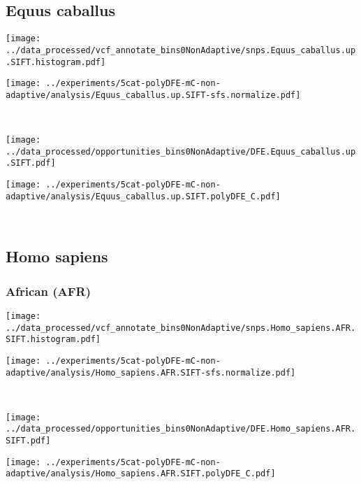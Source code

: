\subsection{Equus caballus}

\begin{minipage}{0.49\linewidth}
    \texttt{[image: ../data\_processed/vcf\_annotate\_bins0NonAdaptive/snps.Equus\_caballus.up.SIFT.histogram.pdf]}
\end{minipage}
\begin{minipage}{0.49\linewidth}
    \texttt{[image: ../experiments/5cat-polyDFE-mC-non-adaptive/analysis/Equus\_caballus.up.SIFT-sfs.normalize.pdf]}
\end{minipage}
\\
\begin{minipage}{0.49\linewidth}
    \texttt{[image: ../data\_processed/opportunities\_bins0NonAdaptive/DFE.Equus\_caballus.up.SIFT.pdf]}
\end{minipage}
\begin{minipage}{0.49\linewidth}
    \texttt{[image: ../experiments/5cat-polyDFE-mC-non-adaptive/analysis/Equus\_caballus.up.SIFT.polyDFE\_C.pdf]}
\end{minipage}
\\

\subsection{Homo sapiens}

\subsubsection{African (AFR)}

\begin{minipage}{0.49\linewidth}
    \texttt{[image: ../data\_processed/vcf\_annotate\_bins0NonAdaptive/snps.Homo\_sapiens.AFR.SIFT.histogram.pdf]}
\end{minipage}
\begin{minipage}{0.49\linewidth}
    \texttt{[image: ../experiments/5cat-polyDFE-mC-non-adaptive/analysis/Homo\_sapiens.AFR.SIFT-sfs.normalize.pdf]}
\end{minipage}
\\
\begin{minipage}{0.49\linewidth}
    \texttt{[image: ../data\_processed/opportunities\_bins0NonAdaptive/DFE.Homo\_sapiens.AFR.SIFT.pdf]}
\end{minipage}
\begin{minipage}{0.49\linewidth}
    \texttt{[image: ../experiments/5cat-polyDFE-mC-non-adaptive/analysis/Homo\_sapiens.AFR.SIFT.polyDFE\_C.pdf]}
\end{minipage}
\\

